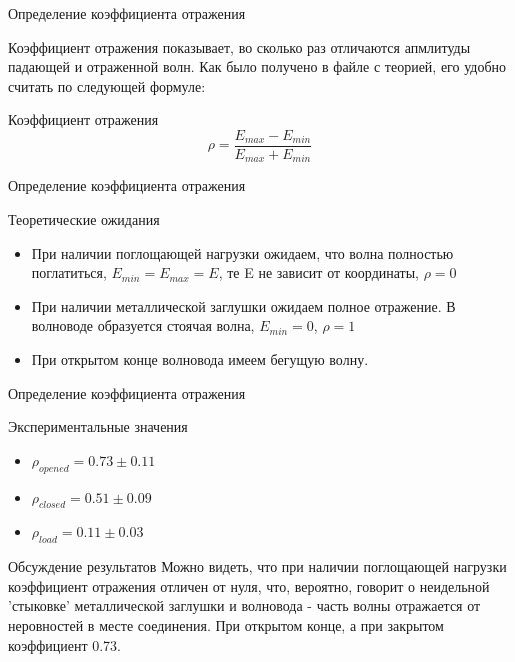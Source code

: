 \documentclass[12pt]{beamer}
\begin{document}
\begin{frame}{Определение коэффициента отражения}

    \begin{block}{}
        Коэффициент отражения показывает, во сколько раз отличаются апмлитуды падающей и отраженной волн. Как было получено в файле с теорией, его удобно считать по следующей формуле:
    \end{block}

    \begin{block}{Коэффициент отражения}
        \begin{equation}
            \rho = \frac{E_{max} - E_{min}}{E_{max} + E_{min}}
        \end{equation}
    \end{block}

       
\end{frame}


\begin{frame}{Определение коэффициента отражения}

    \begin{block}{Теоретические ожидания}
        \begin{itemize}
            \item При наличии поглощающей нагрузки ожидаем, что волна полностью поглатиться, $E_{min} = E_{max} = E$, те E не зависит от координаты, $\rho = 0$
            \item При наличии металлической заглушки ожидаем полное отражение. В волноводе образуется стоячая волна, $E_{min} = 0$, $\rho = 1$
            \item При открытом конце волновода имеем бегущую волну.
        \end{itemize}
    \end{block}
    
\end{frame}

\begin{frame}{Определение коэффициента отражения}

    \begin{block}{Экспериментальные значения}
        \begin{itemize}
            \item $\rho_{opened} = 0.73 \pm 0.11$
            \item $\rho_{closed} = 0.51 \pm 0.09$
            \item $\rho_{load} = 0.11 \pm 0.03$
        \end{itemize}
    \end{block}


    \begin{block}{Обсуждение результатов}
        Можно видеть, что при наличии поглощающей нагрузки коэффициент отражения отличен от нуля, что, вероятно, говорит о неидельной 'стыковке' металлической заглушки и волновода - часть волны отражается от неровностей в месте соединения. При открытом конце, а при закрытом коэффициент 0.73.
    \end{block}

    
\end{frame}
\end{document}
